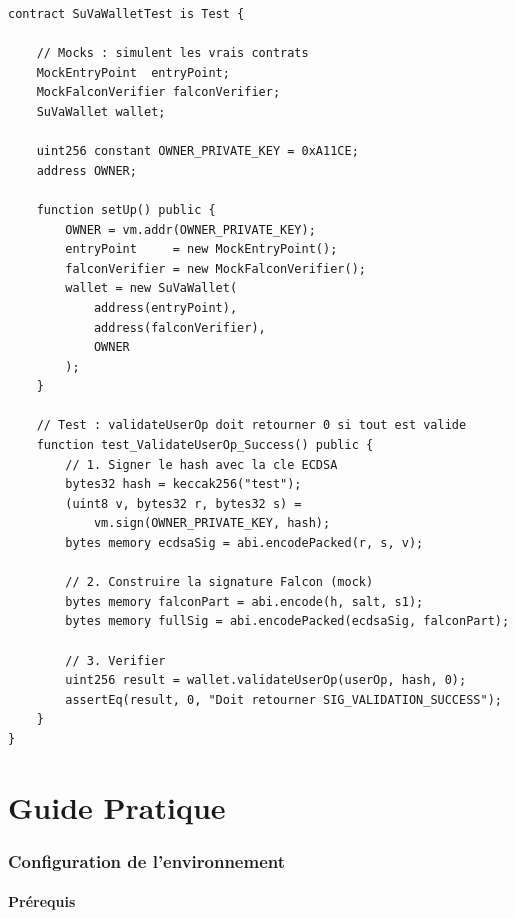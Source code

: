 \documentclass[11pt,a4paper]{article}
\begin{document}
\begin{lstlisting}[style=solidity, caption={SuVaWallet.t.sol --- structure des tests}]
contract SuVaWalletTest is Test {

    // Mocks : simulent les vrais contrats
    MockEntryPoint  entryPoint;
    MockFalconVerifier falconVerifier;
    SuVaWallet wallet;

    uint256 constant OWNER_PRIVATE_KEY = 0xA11CE;
    address OWNER;

    function setUp() public {
        OWNER = vm.addr(OWNER_PRIVATE_KEY);
        entryPoint     = new MockEntryPoint();
        falconVerifier = new MockFalconVerifier();
        wallet = new SuVaWallet(
            address(entryPoint),
            address(falconVerifier),
            OWNER
        );
    }

    // Test : validateUserOp doit retourner 0 si tout est valide
    function test_ValidateUserOp_Success() public {
        // 1. Signer le hash avec la cle ECDSA
        bytes32 hash = keccak256("test");
        (uint8 v, bytes32 r, bytes32 s) =
            vm.sign(OWNER_PRIVATE_KEY, hash);
        bytes memory ecdsaSig = abi.encodePacked(r, s, v);

        // 2. Construire la signature Falcon (mock)
        bytes memory falconPart = abi.encode(h, salt, s1);
        bytes memory fullSig = abi.encodePacked(ecdsaSig, falconPart);

        // 3. Verifier
        uint256 result = wallet.validateUserOp(userOp, hash, 0);
        assertEq(result, 0, "Doit retourner SIG_VALIDATION_SUCCESS");
    }
}
\end{lstlisting}

\newpage
\part{Guide Pratique}

\section{Configuration de l'environnement}

\subsection{Prérequis}
\end{document}
